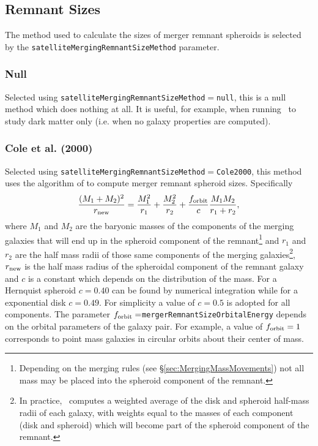 \subsection{Remnant Sizes}

The method used to calculate the sizes of merger remnant spheroids is selected by the {\tt satelliteMergingRemnantSizeMethod} parameter.

\subsubsection{Null}

Selected using {\tt satelliteMergingRemnantSizeMethod}$=${\tt null}, this is a null method which does nothing at all. It is useful, for example, when running \glc\ to study dark matter only (i.e. when no galaxy properties are computed).

\subsubsection{Cole et al. (2000)}\label{sec:MergerRemnantSizeCole2000}

Selected using {\tt satelliteMergingRemnantSizeMethod}$=${\tt Cole2000}, this method uses the algorithm of \cite{cole_hierarchical_2000} to compute merger remnant spheroid sizes. Specifically
\begin{equation}
\frac{(M_1+M_2)^2}{ r_{\rm new}} =
\frac{M_1^2}{r_1} + \frac{M_2^2}{r_2} + \frac{ f_{\rm orbit}}{c}
\frac{M_1 M_2}{r_1+r_2},
\end{equation}
where $M_1$ and $M_2$ are the baryonic masses of the components of the merging galaxies that will end up in the spheroid \gls{component} of the remnant\footnote{Depending on the merging rules (see \S\protect\ref{sec:MergingMassMovements}) not all mass may be placed into the spheroid \gls{component} of the remnant.} and $r_1$ and $r_2$ are the half mass radii of those same components of the merging galaxies\footnote{In practice, \glc\ computes a weighted average of the disk and spheroid half-mass radii of each galaxy, with weights equal to the masses of each \gls{component} (disk and spheroid) which will become part of the spheroid \gls{component} of the remnant.}, $r_{\rm new}$ is the half mass radius of the spheroidal \gls{component} of the remnant galaxy and $c$ is a constant which depends on the distribution of the mass. For a Hernquist spheroid $c=0.40$ can be found by numerical integration while for a exponential disk $c=0.49$. For simplicity a value of $c=0.5$ is adopted for all components. The 
parameter $f_{\rm orbit}=${\tt mergerRemnantSizeOrbitalEnergy} depends on the orbital parameters of the galaxy pair. For example, a value of $f_{\rm orbit} = 1$ corresponds to point mass galaxies in circular orbits about their center of mass. 

